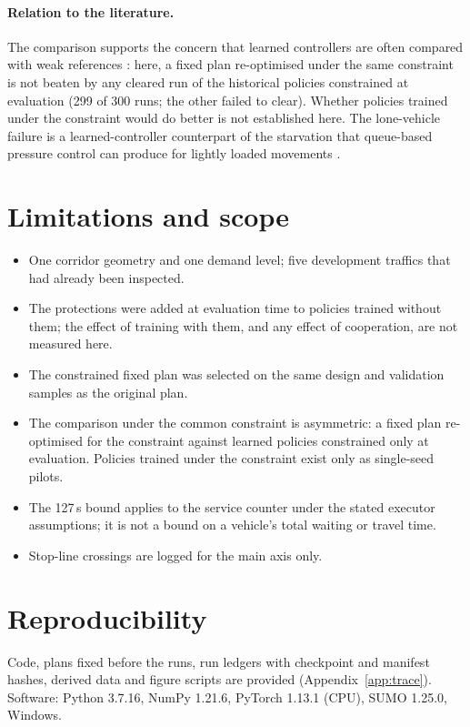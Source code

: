 \documentclass[11pt]{article}
\begin{document}
\paragraph{Relation to the literature.} The comparison supports the concern that learned controllers are often
compared with weak references \cite{ault2020interpretable}: here, a fixed plan re-optimised under the same
constraint is not beaten by any cleared run of the historical policies constrained at evaluation (299 of 300
runs; the other failed to clear). Whether policies trained under the constraint would do better is not
established here. The lone-vehicle failure is a learned-controller counterpart of
the starvation that queue-based pressure control can produce for lightly loaded movements \cite{wu2018delay}.

\section{Limitations and scope}
\begin{itemize}
\item One corridor geometry and one demand level; five development traffics that had already been inspected.
\item The protections were added at evaluation time to policies trained without them; the effect of training
with them, and any effect of cooperation, are not measured here.
\item The constrained fixed plan was selected on the same design and validation samples as the original plan.
\item The comparison under the common constraint is asymmetric: a fixed plan re-optimised for the constraint
against learned policies constrained only at evaluation. Policies trained under the constraint exist only as
single-seed pilots.
\item The 127\,s bound applies to the service counter under the stated executor assumptions; it is not a bound
on a vehicle's total waiting or travel time.
\item Stop-line crossings are logged for the main axis only.
\end{itemize}

\section{Reproducibility}
Code, plans fixed before the runs, run ledgers with checkpoint and manifest hashes, derived data and figure
scripts are provided (Appendix~\ref{app:trace}). Software: Python 3.7.16, NumPy 1.21.6, PyTorch 1.13.1 (CPU),
SUMO 1.25.0, Windows.
\end{document}

